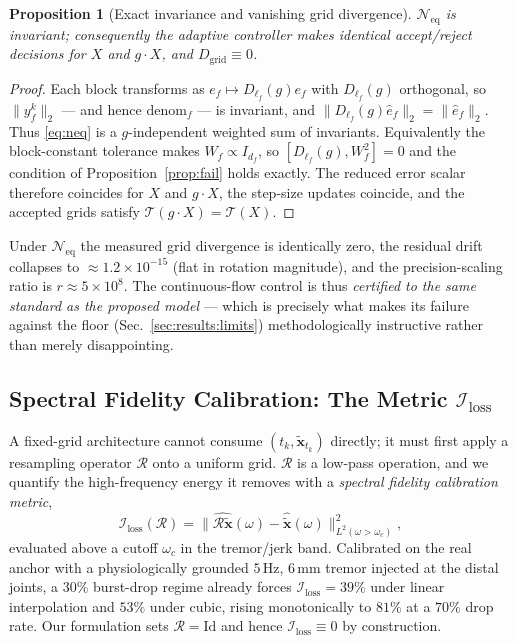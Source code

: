\documentclass[10pt,journal]{IEEEtran}
\newtheorem{proposition}{Proposition}
\begin{document}
\begin{proposition}[Exact invariance and vanishing grid divergence]
\label{prop:neq}
$\mathcal{N}_{\text{eq}}$ is invariant; consequently the adaptive controller makes identical
accept/reject decisions for $X$ and $g\cdot X$, and $D_{\text{grid}}\equiv0$.
\end{proposition}
\begin{proof}
Each block transforms as $e_f\mapsto D_{\ell_f}(g)e_f$ with $D_{\ell_f}(g)$ orthogonal, so
$\|y^k_f\|_2$ --- and hence $\mathrm{denom}_f$ --- is invariant, and
$\|D_{\ell_f}(g)\hat e_f\|_2=\|\hat e_f\|_2$. Thus \eqref{eq:neq} is a $g$-independent weighted sum of
invariants. Equivalently the block-constant tolerance makes $W_f\propto I_{d_f}$, so
$[D_{\ell_f}(g),W_f^2]=0$ and the condition of Proposition~\ref{prop:fail} holds exactly. The reduced
error scalar therefore coincides for $X$ and $g\cdot X$, the step-size updates coincide, and the
accepted grids satisfy $\mathcal{T}(g\cdot X)=\mathcal{T}(X)$.
\end{proof}
%
Under $\mathcal{N}_{\text{eq}}$ the measured grid divergence is identically zero, the residual drift
collapses to $\approx1.2\times10^{-15}$ (flat in rotation magnitude), and the precision-scaling ratio
is $r\approx5\times10^{8}$. The continuous-flow control is thus \emph{certified to the same standard
as the proposed model} --- which is precisely what makes its failure against the floor
(Sec.~\ref{sec:results:limits}) methodologically instructive rather than merely disappointing.

\subsection{Spectral Fidelity Calibration: The Metric $\mathcal{I}_{\text{loss}}$}
\label{sec:method:spectral}

A fixed-grid architecture cannot consume $(t_k,\tilde{\bm{x}}_{t_k})$ directly; it must first apply a
resampling operator $\mathcal{R}$ onto a uniform grid. $\mathcal{R}$ is a low-pass operation, and we
quantify the high-frequency energy it removes with a \emph{spectral fidelity calibration metric},
%
\begin{equation}
\label{eq:iloss}
\mathcal{I}_{\text{loss}}(\mathcal{R})
=\big\|\widehat{\mathcal{R}\tilde{\bm{x}}}(\omega)-\widehat{\tilde{\bm{x}}}(\omega)\big\|^2_{L^2(\omega>\omega_c)} ,
\end{equation}
%
evaluated above a cutoff $\omega_c$ in the tremor/jerk band. Calibrated on the real anchor with a
physiologically grounded $5\,\mathrm{Hz}$, $6\,\mathrm{mm}$ tremor injected at the distal joints, a
$30\%$ burst-drop regime already forces $\mathcal{I}_{\text{loss}}=39\%$ under linear interpolation
and $53\%$ under cubic, rising monotonically to $81\%$ at a $70\%$ drop rate. Our formulation sets
$\mathcal{R}=\mathrm{Id}$ and hence $\mathcal{I}_{\text{loss}}\equiv0$ by construction.
\end{document}
